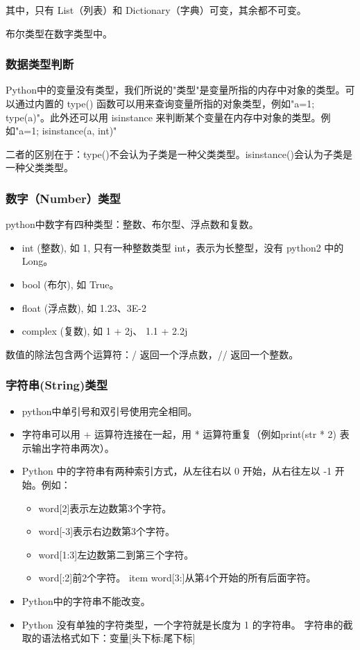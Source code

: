 \documentclass{article}
\begin{document}
其中，只有 List（列表）和 Dictionary（字典）可变，其余都不可变。  

布尔类型在数字类型中。

\subsubsection{数据类型判断}
Python中的变量没有类型，我们所说的"类型"是变量所指的内存中对象的类型。可以通过内置的 type() 函数可以用来查询变量所指的对象类型，例如"a=1; type(a)"。此外还可以用 isinstance 来判断某个变量在内存中对象的类型。例如"a=1; isinstance(a, int)"

二者的区别在于：type()不会认为子类是一种父类类型。isinstance()会认为子类是一种父类类型。

\subsubsection{数字（Number）类型}
python中数字有四种类型：整数、布尔型、浮点数和复数。
\begin{itemize}
\item int (整数), 如 1, 只有一种整数类型 int，表示为长整型，没有 python2 中的 Long。
\item bool (布尔), 如 True。
\item float (浮点数), 如 1.23、3E-2
\item complex (复数), 如 1 + 2j、 1.1 + 2.2j
\end{itemize}

数值的除法包含两个运算符：/ 返回一个浮点数，// 返回一个整数。
\subsubsection{字符串(String)类型}
\begin{itemize}
\item python中单引号和双引号使用完全相同。
\item 字符串可以用 + 运算符连接在一起，用 * 运算符重复（例如print(str * 2) 表示输出字符串两次）。
\item Python 中的字符串有两种索引方式，从左往右以 0 开始，从右往左以 -1 开始。例如：
\begin{itemize}
\item word[2]表示左边数第3个字符。
\item word[-3]表示右边数第3个字符。
\item word[1:3]左边数第二到第三个字符。
\item word[:2]前2个字符。
item word[3:]从第4个开始的所有后面字符。
\end{itemize}
\item Python中的字符串不能改变。
\item Python 没有单独的字符类型，一个字符就是长度为 1 的字符串。
字符串的截取的语法格式如下：变量[头下标:尾下标]
\end{itemize}
\end{document}
